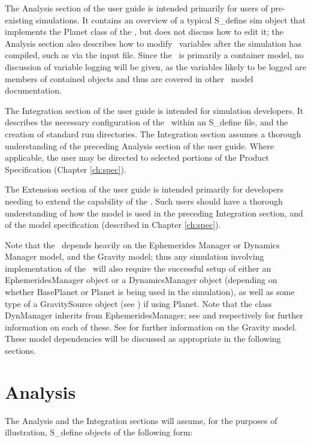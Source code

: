 The Analysis section of the user guide is intended primarily for users of
pre-existing simulations. It contains an overview of a typical S\_define sim
object that implements the Planet class of the \planetDesc, but does not
discuss how to edit it; the Analysis section also describes how to modify
\planetDesc\ variables after the simulation has compiled, such as via the input
file. Since the \planetDesc\ is primarily a container model, no discussion of
variable logging will be given, as the variables likely to be logged are
members of contained objects and thus are covered in other \JEODid\
model documentation.

The Integration section of the user guide is intended for simulation developers.
It describes the necessary configuration of the \planetDesc\ within an
S\_define file, and the creation of standard run directories.  The Integration
section assumes a thorough understanding of the preceding Analysis section
of the user guide. Where applicable, the user may be directed to selected
portions of the Product Specification (Chapter \ref{ch:spec}).

The Extension section of the user guide is intended primarily for developers
needing to extend the capability of the \planetDesc.  Such users should have a
thorough understanding of how the model is used in the preceding Integration
section, and of the model specification (described in Chapter \ref{ch:spec}).

Note that the \planetDesc\ depends heavily on the Ephemerides Manager or
Dynamics Manager model, and the Gravity model; thus any simulation involving
implementation of the \planetDesc\ will also require the successful setup of
either an EphemeridesManager object or a DynamicsManager object (depending
on whether BasePlanet or Planet is being used in the simulation), as well as
some type of a GravitySource object (see \cite{dynenv:GRAVITY}) if using Planet.
 Note that the class DynManager inherits from EphemeridesManager; see
\cite{dynenv:DYNMANAGER} and \cite{dynenv:EPHEMERIDES} respectively for further
information on each of these. See \cite{dynenv:GRAVITY} for further information
on the Gravity model. These model dependencies will be discussed as appropriate
in the following sections.

\section{Analysis}

The Analysis and the Integration sections will assume, for the purposes of
illustration, S\_define objects of the following form:

